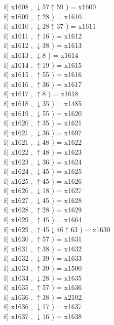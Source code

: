f( x1608 , $\downarrow$57$\uparrow$59 ) = x1609 \\
f( x1609 , $\uparrow$28 ) = x1610 \\
f( x1610 , $\downarrow$28$\uparrow$37 ) = x1611 \\
f( x1611 , $\uparrow$16 ) = x1612 \\
f( x1612 , $\downarrow$38 ) = x1613 \\
f( x1613 , $\downarrow$8 ) = x1614 \\
f( x1614 , $\uparrow$19 ) = x1615 \\
f( x1615 , $\uparrow$55 ) = x1616 \\
f( x1616 , $\uparrow$36 ) = x1617 \\
f( x1617 , $\uparrow$8 ) = x1618 \\
f( x1618 , $\downarrow$35 ) = x1485 \\
f( x1619 , $\downarrow$55 ) = x1620 \\
f( x1620 , $\uparrow$35 ) = x1621 \\
f( x1621 , $\downarrow$36 ) = x1697 \\
f( x1621 , $\downarrow$48 ) = x1622 \\
f( x1622 , $\uparrow$48 ) = x1623 \\
f( x1623 , $\downarrow$36 ) = x1624 \\
f( x1624 , $\downarrow$45 ) = x1625 \\
f( x1625 , $\uparrow$45 ) = x1626 \\
f( x1626 , $\downarrow$18 ) = x1627 \\
f( x1627 , $\downarrow$45 ) = x1628 \\
f( x1628 , $\uparrow$28 ) = x1629 \\
f( x1629 , $\uparrow$45 ) = x1664 \\
f( x1629 , $\uparrow$45$\downarrow$46$\uparrow$63 ) = x1630 \\
f( x1630 , $\uparrow$57 ) = x1631 \\
f( x1631 , $\uparrow$38 ) = x1632 \\
f( x1632 , $\downarrow$39 ) = x1633 \\
f( x1633 , $\uparrow$39 ) = x1500 \\
f( x1634 , $\downarrow$28 ) = x1635 \\
f( x1635 , $\uparrow$57 ) = x1636 \\
f( x1636 , $\uparrow$38 ) = x2102 \\
f( x1636 , $\downarrow$17 ) = x1637 \\
f( x1637 , $\downarrow$16 ) = x1638 \\
